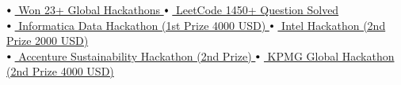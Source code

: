 \documentclass[letterpaper,11pt]{article}
\newcommand\sbullet[1][.5]{\mathbin{\vcenter{\hbox{\scalebox{#1}{$\bullet$}}}}}
\begin{document}
$\sbullet[.75] \hspace{0.1cm}${\href{https://www.hackerearth.com/@raj713335/}{ Won 23+ Global Hackathons }} \hspace{4.8cm}
$\sbullet[.75] \hspace{0.1cm}${\href{https://leetcode.com/u/raj713335/}{ LeetCode 1450+ Question Solved }} \\
$\sbullet[.75] \hspace{0.1cm}${\href{https://hack2skill.com/hack/informatica-deh-2024}{ Informatica Data Hackathon (1st Prize 4000 USD) }} \hspace{1.1cm}
$\sbullet[.75] \hspace{0.1cm}${\href{https://www.hackerearth.com/challenges/hackathon/intel-oneapi-hackathon-for-open-innovation/}{ Intel Hackathon (2nd Prize 2000 USD) }} \\
$\sbullet[.75] \hspace{0.1cm}${\href{https://www.hackerearth.com/challenges/hackathon/accenture-laterals-2/}{ Accenture Sustainability Hackathon (2nd Prize) }} \hspace{1.6cm}
$\sbullet[.75] \hspace{0.1cm}${\href{https://www.hackerearth.com/challenges/hackathon/kpmgs-fullstack-azure-hiring-challenge/}{ KPMG Global Hackathon (2nd Prize 4000 USD) }} \hspace{1.6cm}
\end{document}
